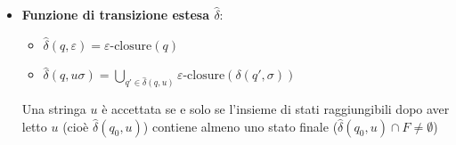\documentclass[12pt, a4paper]{report}
\begin{document}
\begin{itemize}
\begin{itemize}
                        \item \textbf{Funzione di transizione estesa $\hat{\delta}$}: \begin{itemize}
                            \item $\hat{\delta}(q, \varepsilon) = \varepsilon\text{-closure}(q)$
                            \item $\hat{\delta}(q, u\sigma) = \bigcup_{q' \in \hat{\delta}(q, u)} \varepsilon\text{-closure}(\delta(q', \sigma))$
                        \end{itemize}
                        Una stringa $u$ è accettata se e solo se l'insieme di stati raggiungibili dopo aver letto $u$ (cioè $\hat{\delta}(q_0, u)$) contiene almeno uno stato finale ($\hat{\delta}(q_0, u) \cap F \neq \emptyset$)
                    \end{itemize}
                \end{itemize}
\end{document}
